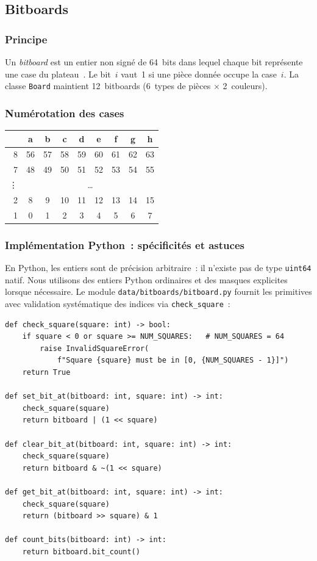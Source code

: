 \documentclass[a4paper,11pt]{article}
\begin{document}
\subsection{Bitboards}

\subsubsection{Principe}

Un \emph{bitboard} est un entier non signé de 64~bits dans lequel chaque bit
représente une case du plateau~\cite{Shannon1950}. Le bit~$i$ vaut~1 si une
pièce donnée occupe la case~$i$. La classe \texttt{Board} maintient
12~bitboards ($6$~types de pièces $\times$ 2~couleurs).

\subsubsection{Numérotation des cases}

\begin{center}
\begin{tabular}{r|cccccccc}
  & a & b & c & d & e & f & g & h \\\hline
8 & 56 & 57 & 58 & 59 & 60 & 61 & 62 & 63 \\
7 & 48 & 49 & 50 & 51 & 52 & 53 & 54 & 55 \\
\vdots & \multicolumn{8}{c}{\dots} \\
2 &  8 &  9 & 10 & 11 & 12 & 13 & 14 & 15 \\
1 &  0 &  1 &  2 &  3 &  4 &  5 &  6 &  7 \\
\end{tabular}
\end{center}

\subsubsection{Implémentation Python~: spécificités et astuces}

En Python, les entiers sont de précision arbitraire~: il n'existe pas de type
\texttt{uint64} natif. Nous utilisons des entiers Python ordinaires et des
masques explicites lorsque nécessaire. Le module \texttt{data/bitboards/bitboard.py}
fournit les primitives avec validation systématique des indices via
\texttt{check\_square}~:

\begin{verbatim}
def check_square(square: int) -> bool:
    if square < 0 or square >= NUM_SQUARES:   # NUM_SQUARES = 64
        raise InvalidSquareError(
            f"Square {square} must be in [0, {NUM_SQUARES - 1}]")
    return True

def set_bit_at(bitboard: int, square: int) -> int:
    check_square(square)
    return bitboard | (1 << square)

def clear_bit_at(bitboard: int, square: int) -> int:
    check_square(square)
    return bitboard & ~(1 << square)

def get_bit_at(bitboard: int, square: int) -> int:
    check_square(square)
    return (bitboard >> square) & 1

def count_bits(bitboard: int) -> int:
    return bitboard.bit_count()
\end{verbatim}
\end{document}
